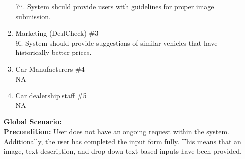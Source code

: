 \documentclass[]{article}
\begin{document}
\begin{enumerate}[{\bf {BE}1.}]
\begin{enumerate}[{\bf VP1.}]
			7ii. System should provide users with guidelines for proper image submission.
		\item Marketing (DealCheck) \#3 \\
			9i. System should provide suggestions of similar vehicles that have historically better prices.
		\item Car Manufacturers \#4 \\
			NA
		\item Car dealership staff \#5 \\
			NA
	\end{enumerate}
	{\bf Global Scenario:}\\
	{\bf Precondition:} User does not have an ongoing request within the system. Additionally, 
	the user has completed the input form fully. This means that an image, 
	text description, and drop-down text-based inputs have been provided.


\end{enumerate}
\end{document}
